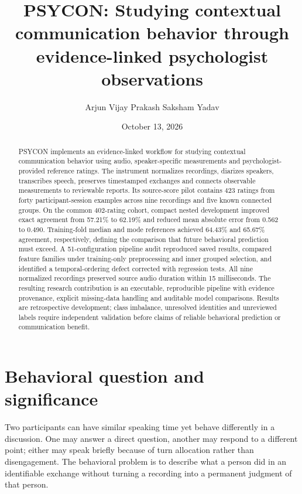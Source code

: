 \documentclass{article}
\title{PSYCON: Studying contextual communication behavior through evidence-linked psychologist observations}
\author{Arjun Vijay Prakash \And Saksham Yadav}
\date{October 13, 2026}
\begin{document}
\maketitle
\begin{abstract}
PSYCON implements an evidence-linked workflow for studying contextual communication behavior using audio, speaker-specific measurements and psychologist-provided reference ratings. The instrument normalizes recordings, diarizes speakers, transcribes speech, preserves timestamped exchanges and connects observable measurements to reviewable reports. Its source-score pilot contains 423 ratings from forty participant-session examples across nine recordings and five known connected groups. On the common 402-rating cohort, compact nested development improved exact agreement from 57.21\% to 62.19\% and reduced mean absolute error from 0.562 to 0.490. Training-fold median and mode references achieved 64.43\% and 65.67\% agreement, respectively, defining the comparison that future behavioral prediction must exceed. A 51-configuration pipeline audit reproduced saved results, compared feature families under training-only preprocessing and inner grouped selection, and identified a temporal-ordering defect corrected with regression tests. All nine normalized recordings preserved source audio duration within 15 milliseconds. The resulting research contribution is an executable, reproducible pipeline with evidence provenance, explicit missing-data handling and auditable model comparisons. Results are retrospective development; class imbalance, unresolved identities and unreviewed labels require independent validation before claims of reliable behavioral prediction or communication benefit.
\end{abstract}

\section{Behavioral question and significance}
Two participants can have similar speaking time yet behave differently in a discussion. One may answer a direct question, another may respond to a different point; either may speak briefly because of turn allocation rather than disengagement. The behavioral problem is to describe what a person did in an identifiable exchange without turning a recording into a permanent judgment of that person.
\end{document}
